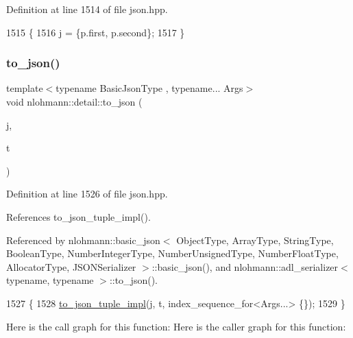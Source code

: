 Definition at line 1514 of file json.\+hpp.


\begin{DoxyCode}
1515 \{
1516     j = \{p.first, p.second\};
1517 \}
\end{DoxyCode}
\mbox{\label{namespacenlohmann_1_1detail_aa7a47b08eee864c2c108c04954919648}} 
\subsubsection{\texorpdfstring{to\+\_\+json()}{to\_json()}\hspace{0.1cm}{\footnotesize\ttfamily [16/16]}}
{\footnotesize\ttfamily template$<$typename Basic\+Json\+Type , typename... Args$>$ \\
void nlohmann\+::detail\+::to\+\_\+json (\begin{DoxyParamCaption}\item[{Basic\+Json\+Type \&}]{j,  }\item[{const std\+::tuple$<$ Args... $>$ \&}]{t }\end{DoxyParamCaption})}



Definition at line 1526 of file json.\+hpp.



References to\+\_\+json\+\_\+tuple\+\_\+impl().



Referenced by nlohmann\+::basic\+\_\+json$<$ Object\+Type, Array\+Type, String\+Type, Boolean\+Type, Number\+Integer\+Type, Number\+Unsigned\+Type, Number\+Float\+Type, Allocator\+Type, J\+S\+O\+N\+Serializer $>$\+::basic\+\_\+json(), and nlohmann\+::adl\+\_\+serializer$<$ typename, typename $>$\+::to\+\_\+json().


\begin{DoxyCode}
1527 \{
1528     \hyperlink{namespacenlohmann_1_1detail_a510dfa15b01e9a8afe31600a27b28199}{to\_json\_tuple\_impl}(j, t, index\_sequence\_for<Args...> \{\});
1529 \}
\end{DoxyCode}
Here is the call graph for this function\+:
Here is the caller graph for this function\+:
\mbox{\label{namespacenlohmann_1_1detail_a510dfa15b01e9a8afe31600a27b28199}} 
